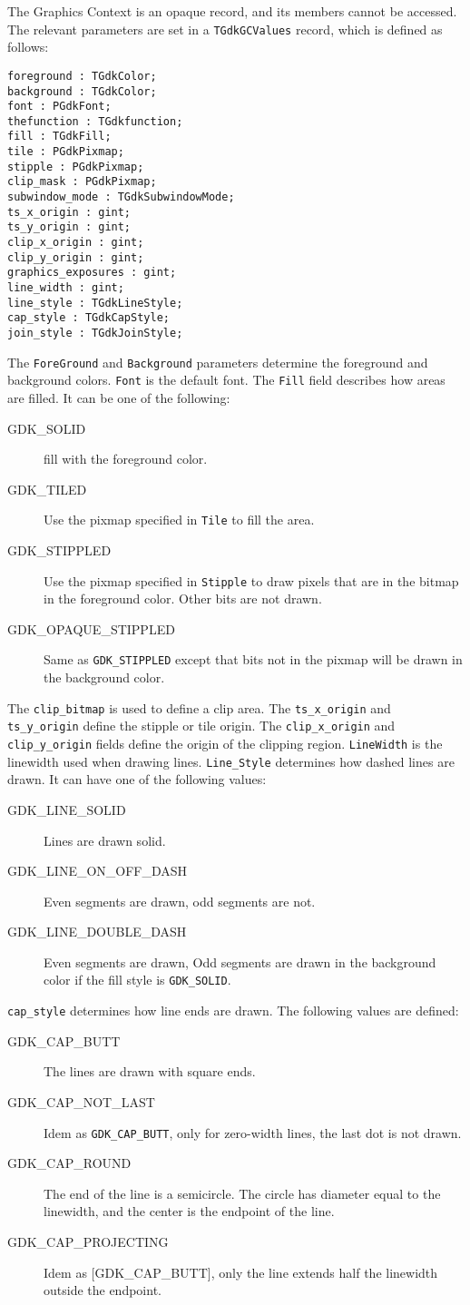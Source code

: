 \documentclass[10pt]{article}
\newcommand{\var}[1]{\texttt{#1}}
\begin{document}
The Graphics Context is an opaque record, and its members cannot be
accessed. The relevant parameters are set in a \var{TGdkGCValues} record,
which is defined as follows:
\begin{verbatim}
foreground : TGdkColor;
background : TGdkColor;
font : PGdkFont;
thefunction : TGdkfunction;
fill : TGdkFill;
tile : PGdkPixmap;
stipple : PGdkPixmap;
clip_mask : PGdkPixmap;
subwindow_mode : TGdkSubwindowMode;
ts_x_origin : gint;
ts_y_origin : gint;
clip_x_origin : gint;
clip_y_origin : gint;
graphics_exposures : gint;
line_width : gint;
line_style : TGdkLineStyle;
cap_style : TGdkCapStyle;
join_style : TGdkJoinStyle;
\end{verbatim}
The \var{ForeGround} and \var{Background} parameters determine the foreground
and background colors. \var{Font} is the default font. The \var{Fill} field
describes how areas are filled. It can be one of the following:
\begin{description}
\item[GDK\_SOLID] fill with the foreground color.
\item[GDK\_TILED] Use the pixmap specified in \var{Tile} to fill the area.
\item[GDK\_STIPPLED] Use the pixmap specified in \var{Stipple} to draw
pixels that are in the bitmap in the foreground color. Other bits are not
drawn.
\item[GDK\_OPAQUE\_STIPPLED] Same as \var{GDK\_STIPPLED} except that bits 
not in the pixmap will be drawn in the background color.
\end{description}
The \var{clip\_bitmap} is used to define a clip area. The
\var{ts\_x\_origin} and \var{ts\_y\_origin} define the stipple or tile
origin.  The \var{clip\_x\_origin} and \var{clip\_y\_origin} fields define 
the origin of the clipping region.
\var{LineWidth} is the linewidth used when drawing lines. \var{Line\_Style}
determines how dashed lines are drawn. It can have one of the following
values:
\begin{description}
\item[GDK\_LINE\_SOLID] Lines are drawn solid.
\item[GDK\_LINE\_ON\_OFF\_DASH] Even segments are drawn, odd segments are
not.
\item[GDK\_LINE\_DOUBLE\_DASH] Even segments are drawn, Odd segments are
drawn in the background color if the fill style is \var{GDK\_SOLID}.
\end{description}
\var{cap\_style} determines how line ends are drawn. The following values are
defined:
\begin{description}
\item[GDK\_CAP\_BUTT] The lines are drawn with square ends.  
\item[GDK\_CAP\_NOT\_LAST] Idem as \var{GDK\_CAP\_BUTT}, only for zero-width
lines, the last dot is not drawn.
\item[GDK\_CAP\_ROUND] The end of the line is a semicircle. The circle has
diameter equal to the linewidth, and the center is the endpoint of the line.
\item[GDK\_CAP\_PROJECTING] Idem as [GDK\_CAP\_BUTT], only the line extends
half the linewidth outside the endpoint.
\end{description}
\end{document}
